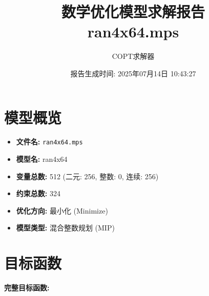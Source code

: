 \documentclass[a4paper,10pt]{article}
\title{数学优化模型求解报告\\{\large ran4x64.mps}}
\author{COPT求解器}
\date{报告生成时间: 2025年07月14日 10:43:27}
\begin{document}
\maketitle
\tableofcontents
\newpage

\section{模型概览}
\begin{itemize}
    \item \textbf{文件名:} \texttt{ran4x64.mps}
    \item \textbf{模型名:} ran4x64
    \item \textbf{变量总数:} 512 (二元: 256, 整数: 0, 连续: 256)
    \item \textbf{约束总数:} 324
    \item \textbf{优化方向:} 最小化 (Minimize)
    \item \textbf{模型类型:} 混合整数规划 (MIP)
\end{itemize}
\section{目标函数}

\textbf{完整目标函数:}
\end{document}
